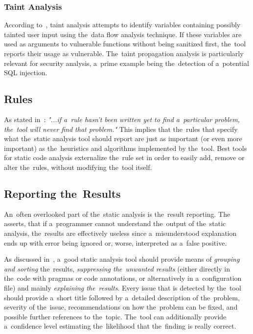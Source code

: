 \documentclass[
  digital, %
  table,   %
  lof,     %
  lot,     %
  oneside,
]{fithesis3}
\begin{document}
\subsubsection{\textbf{Taint Analysis}}
According to~\cite{oswap-sca}, taint analysis attempts to identify variables containing possibly tainted user input using the~data flow analysis technique. If these variables are used as arguments to vulnerable functions without being sanitized first, the~tool reports their usage as vulnerable. The~taint propagation analysis is particularly relevant for security analysis, a~prime example being the~detection of a~potential SQL injection.

\subsection{Rules}
As stated in~\cite{sca-for-security}: \textit{"...if a~rule hasn’t been written yet to find a~particular problem, the~tool will never find that problem."} This implies that the~rules that specify what the~static analysis tool should report are just as important (or even more important) as the~heuristics and algorithms implemented by the~tool. Best tools for static code analysis externalize the~rule set in order to easily add, remove or alter the~rules, without modifying the~tool itself.

\subsection{Reporting the~Results}
An~often overlooked part of the~static analysis is the~result reporting. The~\cite{coverity-sca} asserts, that if a~programmer cannot understand the~output of the~static analysis, the~results are effectively useless since a~misunderstood explanation ends up with error being ignored or, worse, interpreted as a~false positive.

As discussed in~\cite{secure-programming-with-sca}, a~good static analysis tool should provide means of \textit{grouping and sorting} the~results, \textit{suppressing the~unwanted results} (either directly in the~code with pragmas or code annotations, or alternatively in a~configuration file) and mainly \textit{explaining the~results}. Every issue that is detected by the~tool should provide a~short title followed by a~detailed description of the~problem, severity of the~issue, recommendations on how the~problem can be fixed, and possible further references to the~topic. The~tool can additionally provide a~confidence level estimating the~likelihood that the~finding is really correct.
\end{document}
